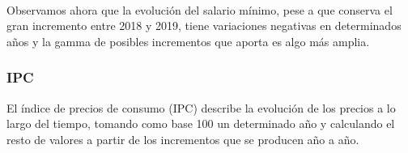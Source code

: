 \documentclass[11pt]{article}
\begin{document}
    \begin{center}
    \end{center}
    { \hspace*{\fill} \\}
    
    Observamos ahora que la evolución del salario mínimo, pese a que
conserva el gran incremento entre 2018 y 2019, tiene variaciones
negativas en determinados años y la gamma de posibles incrementos que
aporta es algo más amplia.

    \subsubsection{IPC}\label{ipc}

    El índice de precios de consumo (IPC) describe la evolución de los
precios a lo largo del tiempo, tomando como base 100 un determinado año
y calculando el resto de valores a partir de los incrementos que se
producen año a año.
\end{document}
